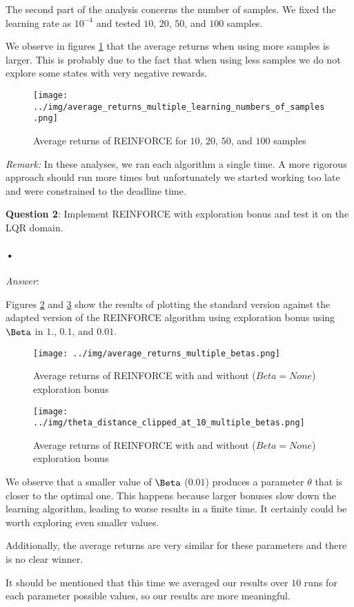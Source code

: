 \documentclass[a4paper]{article}
\begin{document}
The second part of the analysis concerns the number of samples. We fixed the learning rate as $10^{-4}$ and tested $10$, $20$, $50$, and $100$ samples.

We observe in figures \ref{fig:average_returns_multiple_samples_numbers} that the average returns when using more samples is larger. This is probably due to the fact that when using less samples we do not explore some states with very negative rewards.

\begin{figure}
\caption{\label{fig:average_returns_multiple_samples_numbers} Average returns of REINFORCE for $10$, $20$, $50$, and $100$ samples}
\centering
\texttt{[image: ../img/average\_returns\_multiple\_learning\_numbers\_of\_samples.png]}
\end{figure}

\textit{Remark:} In these analyses, we ran each algorithm a single time. A more rigorous approach should run more times but unfortunately we started working too late and were constrained to the deadline time.

\textbf{Question 2}: Implement REINFORCE with exploration bonus and test it on the LQR domain.
\paragraph{•}
\textit{Answer}:

Figures \ref{fig:exploration_bonus_average_returns} and \ref{fig:exploration_bonus_theta_distance} show the results of plotting the standard version against the adapted version of the REINFORCE algorithm using exploration bonus using $\Beta$ in $1.$, $0.1$, and $0.01$.

\begin{figure}
\centering
\texttt{[image: ../img/average\_returns\_multiple\_betas.png]}
\caption{\label{fig:exploration_bonus_average_returns} Average returns of REINFORCE with and without ($Beta = None$) exploration bonus}
\end{figure}

\begin{figure}
\centering
\texttt{[image: ../img/theta\_distance\_clipped\_at\_10\_multiple\_betas.png]}
\caption{\label{fig:exploration_bonus_theta_distance} Average returns of REINFORCE with and without ($Beta = None$) exploration bonus}
\end{figure}

We observe that a smaller value of $\Beta$ ($0.01$) produces a parameter $\theta$ that is closer to the optimal one. This happens because larger bonuses slow down the learning algorithm, leading to worse results in a finite time. It certainly could be worth exploring even smaller values.

Additionally, the average returns are very similar for these parameters and there is no clear winner.

It should be mentioned that this time we averaged our results over $10$ runs for each parameter possible values, so our results are more meaningful.
\end{document}
